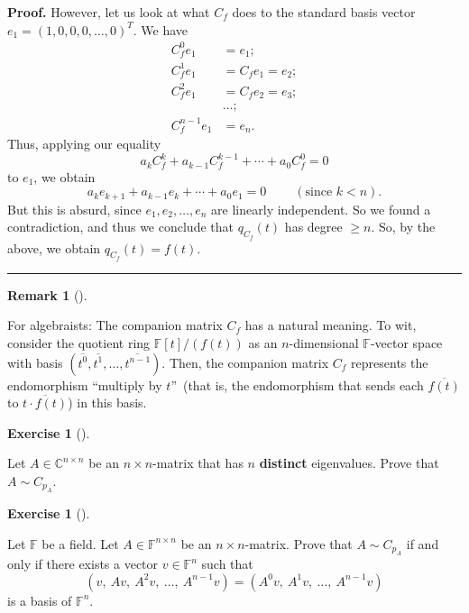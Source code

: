 \documentclass[numbers=enddot,12pt,final,onecolumn,notitlepage]{scrartcl}%
\newcounter{exer}
\numberwithin{exer}{subsection}
\theoremstyle{definition}
\newtheorem{remk}[theo]{Remark}
\newenvironment{remark}[1][]
{\begin{remk}[#1]\begin{leftbar}}
{\end{leftbar}\end{remk}}
\newtheorem{exmp}[exer]{Exercise}
\newenvironment{exercise}[1][]
{\begin{exmp}[#1]\begin{leftbar}}
{\end{leftbar}\end{exmp}}
\newenvironment{proof}[1][Proof]{\noindent\textbf{#1.} }{\ \rule{0.5em}{0.5em}}
\begin{document}
\begin{proof}
However, let us look at what $C_{f}$ does to the standard basis vector
$e_{1}=\left(  1,0,0,0,\ldots,0\right)  ^{T}$. We have%
\begin{align*}
C_{f}^{0}e_{1}  &  =e_{1};\\
C_{f}^{1}e_{1}  &  =C_{f}e_{1}=e_{2};\\
C_{f}^{2}e_{1}  &  =C_{f}e_{2}=e_{3};\\
&  \ldots;\\
C_{f}^{n-1}e_{1}  &  =e_{n}.
\end{align*}
Thus, applying our equality%
\[
a_{k}C_{f}^{k}+a_{k-1}C_{f}^{k-1}+\cdots+a_{0}C_{f}^{0}=0
\]
to $e_{1}$, we obtain%
\[
a_{k}e_{k+1}+a_{k-1}e_{k}+\cdots+a_{0}e_{1}=0\ \ \ \ \ \ \ \ \ \ \left(
\text{since }k<n\right)  .
\]
But this is absurd, since $e_{1},e_{2},\ldots,e_{n}$ are linearly independent.
So we found a contradiction, and thus we conclude that $q_{C_{f}}\left(
t\right)  $ has degree $\geq n$. So, by the above, we obtain $q_{C_{f}}\left(
t\right)  =f\left(  t\right)  $.
\end{proof}

\begin{remark}
For algebraists: The companion matrix $C_{f}$ has a natural meaning. To wit,
consider the quotient ring $\mathbb{F}\left[  t\right]  /\left(  f\left(
t\right)  \right)  $ as an $n$-dimensional $\mathbb{F}$-vector space with
basis $\left(  \overline{t^{0}},\overline{t^{1}},\ldots,\overline{t^{n-1}%
}\right)  $. Then, the companion matrix $C_{f}$ represents the endomorphism
\textquotedblleft multiply by $t$\textquotedblright\ (that is, the
endomorphism that sends each $\overline{f\left(  t\right)  }$ to
$\overline{t\cdot f\left(  t\right)  }$) in this basis.
\end{remark}

\begin{exercise}
 Let $A\in\mathbb{C}^{n\times n}$ be an $n\times n$-matrix that has
$n$ \textbf{distinct} eigenvalues. Prove that $A\sim C_{p_{A}}$.
\end{exercise}

\begin{exercise}
 Let $\mathbb{F}$ be a field. Let $A\in\mathbb{F}^{n\times n}$ be an
$n\times n$-matrix. Prove that $A\sim C_{p_{A}}$ if and only if there exists a
vector $v\in\mathbb{F}^{n}$ such that
\[
\left(  v,\ Av,\ A^{2}v,\ \ldots,\ A^{n-1}v\right)  =\left(  A^{0}%
v,\ A^{1}v,\ \ldots,\ A^{n-1}v\right)
\]
is a basis of $\mathbb{F}^{n}$.
\end{exercise}
\end{document}
